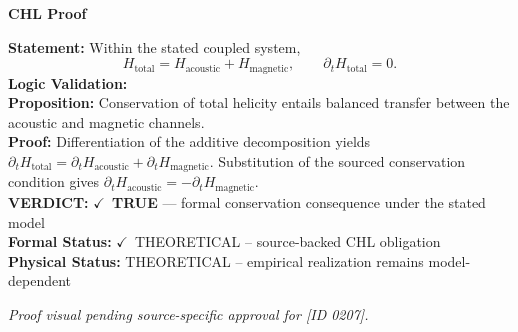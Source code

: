 \vspace{0.45em}
\noindent\textbf{CHL Proof}\par
\textbf{Statement:} Within the stated coupled system,
\[
H_{\mathrm{total}}=H_{\mathrm{acoustic}}+H_{\mathrm{magnetic}},\qquad \partial_t H_{\mathrm{total}}=0.
\]
\textbf{Logic Validation:}\\
\textbf{Proposition:} Conservation of total helicity entails balanced transfer between the acoustic and magnetic channels.\\
\textbf{Proof:} Differentiation of the additive decomposition yields \(\partial_t H_{\mathrm{total}}=\partial_t H_{\mathrm{acoustic}}+\partial_t H_{\mathrm{magnetic}}\). Substitution of the sourced conservation condition gives \(\partial_t H_{\mathrm{acoustic}}=-\partial_t H_{\mathrm{magnetic}}\).\\
\textbf{VERDICT:} \ensuremath{\checkmark}\ \textbf{TRUE} --- formal conservation consequence under the stated model\\
\textbf{Formal Status:} \ensuremath{\checkmark}\ THEORETICAL -- source-backed CHL obligation\\
\textbf{Physical Status:} THEORETICAL -- empirical realization remains model-dependent
\par\vspace{0.45em}
\par
\vfill
\begingroup\footnotesize\itshape
Proof visual pending source-specific approval for [ID 0207].
\par\endgroup
\vfill
\endgroup
\endgroup
